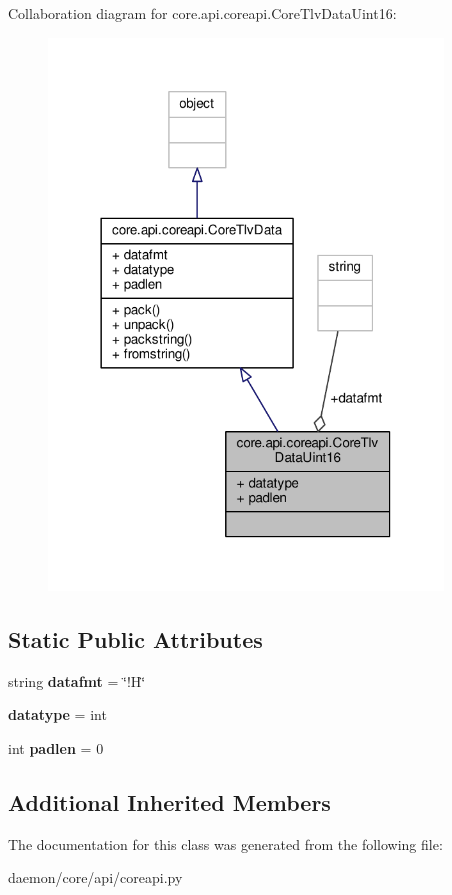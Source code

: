Collaboration diagram for core.\+api.\+coreapi.\+Core\+Tlv\+Data\+Uint16\+:
\nopagebreak
\begin{figure}[H]
\begin{center}
\leavevmode
\includegraphics[width=297pt]{classcore_1_1api_1_1coreapi_1_1_core_tlv_data_uint16__coll__graph}
\end{center}
\end{figure}
\subsection*{Static Public Attributes}
\begin{DoxyCompactItemize}
\item 
\hypertarget{classcore_1_1api_1_1coreapi_1_1_core_tlv_data_uint16_a4d4566fc2007f1d869095708294ffd11}{string {\bfseries datafmt} = \char`\"{}!H\char`\"{}}\label{classcore_1_1api_1_1coreapi_1_1_core_tlv_data_uint16_a4d4566fc2007f1d869095708294ffd11}

\item 
\hypertarget{classcore_1_1api_1_1coreapi_1_1_core_tlv_data_uint16_ae2c2314c41c204b22da65c9a2698f30c}{{\bfseries datatype} = int}\label{classcore_1_1api_1_1coreapi_1_1_core_tlv_data_uint16_ae2c2314c41c204b22da65c9a2698f30c}

\item 
\hypertarget{classcore_1_1api_1_1coreapi_1_1_core_tlv_data_uint16_a5e0206b049048f8019e8d1197f8c6c6f}{int {\bfseries padlen} = 0}\label{classcore_1_1api_1_1coreapi_1_1_core_tlv_data_uint16_a5e0206b049048f8019e8d1197f8c6c6f}

\end{DoxyCompactItemize}
\subsection*{Additional Inherited Members}


The documentation for this class was generated from the following file\+:\begin{DoxyCompactItemize}
\item 
daemon/core/api/coreapi.\+py\end{DoxyCompactItemize}
